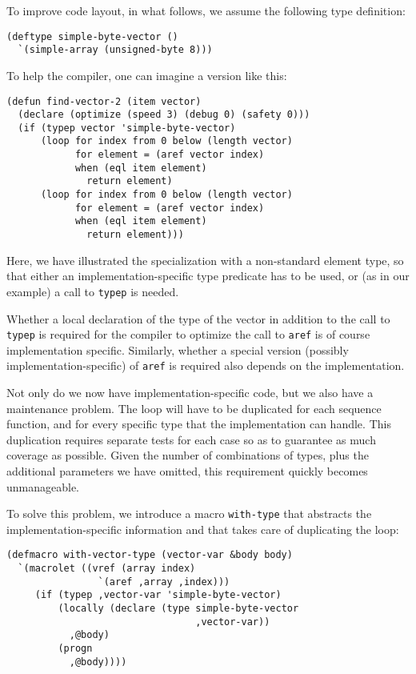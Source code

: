 To improve code layout, in what follows, we assume the following type
definition:

{\small\begin{verbatim}
(deftype simple-byte-vector ()
  `(simple-array (unsigned-byte 8)))
\end{verbatim}}

To help the compiler, one can imagine a version like this:

{\small\begin{verbatim}
(defun find-vector-2 (item vector)
  (declare (optimize (speed 3) (debug 0) (safety 0)))
  (if (typep vector 'simple-byte-vector)
      (loop for index from 0 below (length vector)
            for element = (aref vector index)
            when (eql item element)
              return element)
      (loop for index from 0 below (length vector)
            for element = (aref vector index)
            when (eql item element)
              return element)))
\end{verbatim}}

Here, we have illustrated the specialization with a non-standard
element type, so that either an implementation-specific type predicate
has to be used, or (as in our example) a call to \texttt{typep} is
needed.

Whether a local declaration of the type of the vector in addition to
the call to \texttt{typep} is required for the compiler to optimize
the call to \texttt{aref} is of course implementation specific.
Similarly, whether a special version (possibly
implementation-specific) of \texttt{aref} is required also depends on
the implementation.

Not only do we now have implementation-specific code, but we also
have a maintenance problem.  The loop will have to be duplicated for
each sequence function, and for every specific type that the
implementation can handle.  This duplication requires separate tests
for each case so as to guarantee as much coverage as possible.  Given
the number of combinations of types, plus the additional parameters we
have omitted, this requirement quickly becomes unmanageable.

To solve this problem, we introduce a macro \texttt{with-type} that
abstracts the implementation-specific information and that takes care
of duplicating the loop:

{\small\begin{verbatim}
(defmacro with-vector-type (vector-var &body body)
  `(macrolet ((vref (array index)
                `(aref ,array ,index)))
     (if (typep ,vector-var 'simple-byte-vector)
         (locally (declare (type simple-byte-vector
                                 ,vector-var))
           ,@body)
         (progn
           ,@body))))
\end{verbatim}}

